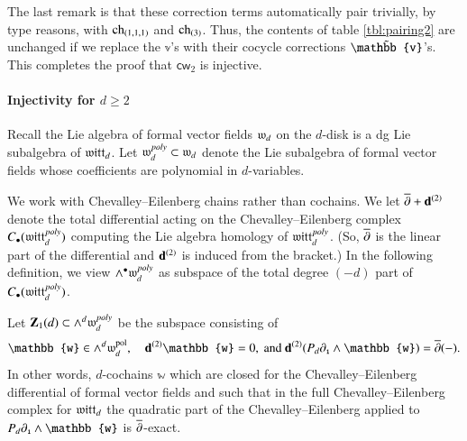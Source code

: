 \documentclass[main.tex]{subfiles}
\begin{document}
The last remark is that these correction terms automatically pair trivially, by type reasons, with $\operatorname{ch}_{(1,1,1)}$ and $\operatorname{ch}_{(3)}
$.
Thus, the contents of table \ref{tbl:pairing2} are unchanged if we replace the $\mathbb{v}$'s with their cocycle
corrections $\til{\mathbb{v}}$'s.
        This completes the proof that $\mathsf{cw}_2$ is injective. 

\paragraph{Injectivity for $d\geq 2$}
Recall the Lie algebra of formal vector fields $\mathfrak{w}_d$ on the $d$-disk is a dg Lie subalgebra of $\mathfrak{witt}_d$.
Let $\mathfrak{w}^{poly}_d \subset \mathfrak{w}_d$ denote the Lie subalgebra of formal vector fields whose coefficients are
polynomial in $d$-variables.

We work with Chevalley--Eilenberg chains rather than cochains.
We let $\overline{\partial} + \mathbf d^{(2)}$ denote the total differential acting on the Chevalley--Eilenberg complex
$C_\bullet(\mathfrak{witt}^{poly}_d)$ computing the Lie algebra homology of $\mathfrak{witt}^{poly}_d$.
(So, $\overline{\partial}$ is the linear part of the differential and $\mathbf d^{(2)}$ is induced from the bracket.)
In the following definition, we view $\wedge^\bullet \mathfrak{w}_d^{poly}$ as subspace of the total degree $(-d)$ part of
$C_\bullet(\mathfrak{witt}^{poly}_d)$.

\begin{definition}
  Let $\mathbf{Z}_1(d)\subset \wedge^d \mathfrak{w}^{poly}_d$ be the subspace consisting of
    $$
    \mathbb{w}\in \wedge^d \lie{w}^{\mathrm{pol}}_d,\quad \mathbf{d}^{(2)}\mathbb{w}=0,\ \text{and}\  \mathbf{d}^{(2)}
    (P_d\partial_{\1}\wedge\mathbb{w})=\dbar(-).
    $$
    In other words, $d$-cochains $\mathbb{w}$ which are closed for the Chevalley--Eilenberg differential of formal vector fields and
    such that in the full Chevalley--Eilenberg complex for $\mathfrak{witt}_d$ the quadratic part of the
    Chevalley--Eilenberg applied to $P_d \del_{\1} \wedge \mathbb{w}$ is $\overline{\partial}$-exact.
\end{definition}

\end{document}
